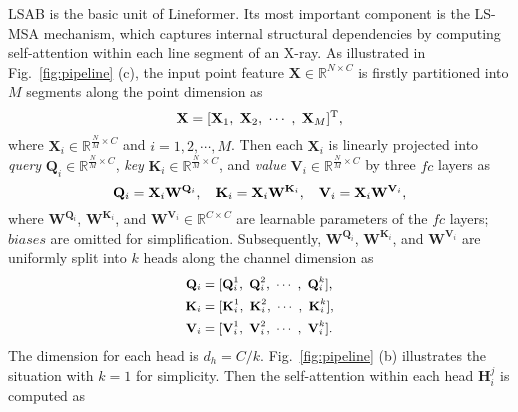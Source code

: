 \documentclass[10pt,twocolumn,letterpaper]{article}
\begin{document}
LSAB is the basic unit of Lineformer. Its most important component is the LS-MSA mechanism, which captures internal structural dependencies by computing self-attention within each line segment of an X-ray. As illustrated in Fig.~\ref{fig:pipeline} (c), the input point feature $\mathbf{X} \in \mathbb{R}^{N \times C}$ is firstly partitioned into $M$ segments along the point dimension as
\vspace{-0.5mm}
\begin{equation}
\small
\mathbf{X} = [\mathbf{X}_1,~\mathbf{X}_2,~\cdots~,~ \mathbf{X}_M]^{\text{T}},
\label{eq:partition}
\vspace{-0.3mm}
\end{equation}
where $\mathbf{X}_i \in \mathbb{R}^{\frac{N}{M} \times C}$ and $ i = 1, 2, \cdots , M$. Then each $\mathbf{X}_i$ is linearly projected into  \emph{query} $\mathbf{Q}_i \in \mathbb{R}^{\frac{N}{M} \times C}$, \emph{key} $\mathbf{K}_i \in \mathbb{R}^{\frac{N}{M} \times C}$, and \emph{value} $\mathbf{V}_i \in \mathbb{R}^{\frac{N}{M} \times C}$ by three $fc$ layers as
\vspace{0.1mm}
\begin{equation}
\small
\mathbf{Q}_i = \mathbf{X}_i\mathbf{W}^{\mathbf{Q}_i},~~~\mathbf{K}_i = \mathbf{X}_i\mathbf{W}^{\mathbf{K}_i},~~~\mathbf{V}_i = \mathbf{X}_i\mathbf{W}^{\mathbf{V}_i},
\label{linear_proj}
\end{equation}
where $\mathbf{W}^{\mathbf{Q}_i}$, $\mathbf{W}^{\mathbf{K}_i}$, and $\mathbf{W}^{\mathbf{V}_i} \in \mathbb{R}^{C \times C}$ are learnable parameters of the $fc$ layers; $biases$ are omitted for simplification. Subsequently, $\mathbf{W}^{\mathbf{Q}_i}$, $\mathbf{W}^{\mathbf{K}_i}$, and $\mathbf{W}^{\mathbf{V}_i}$ are uniformly split into $k$ heads along the channel dimension as
\begin{equation}
\small
\begin{aligned}
\mathbf{Q}_i &= [\mathbf{Q}_i^1,~\mathbf{Q}_i^2,~\cdots~,~\mathbf{Q}_i^k], \\
\mathbf{K}_i &= [\mathbf{K}_i^1,~\mathbf{K}_i^2,~\cdots~,~\mathbf{K}_i^k], \\
\mathbf{V}_i &= [\mathbf{V}_i^1,~\mathbf{V}_i^2,~\cdots~,~\mathbf{V}_i^k].
\end{aligned}
\end{equation}
The dimension for each head is $d_h = C/k$. Fig.~\ref{fig:pipeline} (b) illustrates the situation with $k = 1$ for simplicity. Then the self-attention within each head $\mathbf{H}_i^j$ is computed as
\vspace{-0.6mm}
\end{document}
